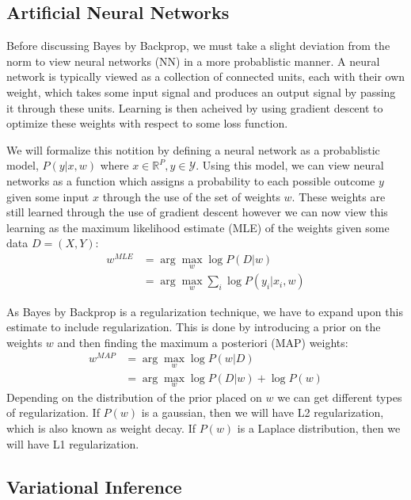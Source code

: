 \documentclass[11pt]{article}
\begin{document}
\subsection{Artificial Neural Networks}
Before discussing Bayes by Backprop, we must take a slight deviation from
the norm to view neural networks (NN) in a more probablistic manner. A neural 
network is typically viewed as a collection of connected units, each with 
their own weight, which takes some input signal and produces an output
signal by passing it through these units. Learning is then acheived by 
using gradient descent to optimize these weights with respect to some loss
function. 

We will formalize this notition by defining a neural network as a probablistic
model, $P(y|x,w)$ where $x \in \mathbb{R}^P, y \in \mathcal{Y}$. Using this 
model, we can view neural networks as a function which assigns a probability
to each possible outcome $y$ given some input $x$ through the use of the set
of weights $w$. These weights are still learned through the use of gradient 
descent however we can now view this learning as the maximum likelihood 
estimate (MLE) of the weights given some data $D=(X,Y)$:
\begin{align*}
  w^{MLE} &= \arg\max_w \log P(D|w) \\ 
  &= \arg\max_w \sum_i \log P(y_i|x_i, w) 
\end{align*}

As Bayes by Backprop is a regularization technique, we have to expand upon this
estimate to include regularization. This is done by introducing a prior on the
weights $w$ and then finding the maximum a posteriori (MAP) weights:
\begin{align*}
  w^{MAP} &= \arg\max_w \log P(w|D) \\
  &= \arg\max_w \log P(D|w) + \log P(w) 
\end{align*}
Depending on the distribution of the prior placed on $w$ we can get different
types of regularization. If $P(w)$ is a gaussian, then we will have L2 
regularization, which is also known as weight decay. If $P(w)$ is a
Laplace distribution, then we will have L1 regularization.


\subsection{Variational Inference}

\end{document}
